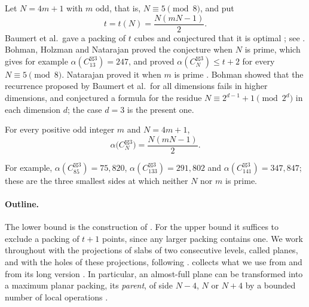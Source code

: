 \documentclass[11pt,colorlinks]{charlie}
\newcommand{\spow}{\boxtimes}
\begin{document}
Let $N=4m+1$ with $m$ odd, that is, $N\equiv5\pmod8$, and put
\[
 t=t(N)=\frac{N(mN-1)}{2}.
\]
Baumert et al.\ gave a packing of $t$ cubes and conjectured that it is optimal \cite{BBC}; see \cite[Section~1]{BHN}. Bohman, Holzman and Natarajan \cite{BHN} proved the conjecture when $N$ is prime, which gives for example $\alpha(C_{13}^{\spow3})=247$, and proved $\alpha(C_N^{\spow3})\le t+2$ for every $N\equiv5\pmod8$. Natarajan proved it when $m$ is prime \cite[Section~1]{BHN}. Bohman \cite{Bohman} showed that the recurrence proposed by Baumert et al.\ for all dimensions fails in higher dimensions, and conjectured a formula for the residue $N\equiv2^{d-1}+1\pmod{2^d}$ in each dimension $d$; the case $d=3$ is the present one.

\begin{theorem}\label{thm:main}
For every positive odd integer $m$ and $N=4m+1$,
\[
 \alpha\bigl(C_N^{\spow3}\bigr)=\frac{N(mN-1)}2 .
\]
\end{theorem}

For example, $\alpha(C_{85}^{\spow3})=75{,}820$, $\alpha(C_{133}^{\spow3})=291{,}802$ and $\alpha(C_{141}^{\spow3})=347{,}847$; these are the three smallest sides at which neither $N$ nor $m$ is prime.

\paragraph{Outline.}
The lower bound is the construction of \cite{BBC}. For the upper bound it suffices to exclude a packing of $t+1$ points, since any larger packing contains one. We work throughout with the projections of slabs of two consecutive levels, called planes, and with the holes of these projections, following \cite{BHN}.  collects what we use from \cite{BHN} and from its long version \cite{BHNlong}. In particular, an almost-full plane can be transformed into a maximum planar packing, its \emph{parent}, of side $N-4$, $N$ or $N+4$ by a bounded number of local operations \cite[Theorem~22]{BHNlong}.
\end{document}
